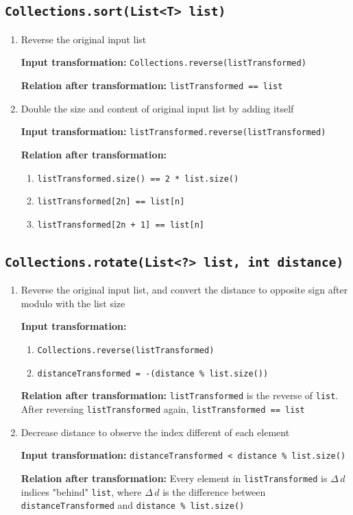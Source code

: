 \documentclass[12pt, a4paper]{article}
\begin{document}
\subsection{\texttt{Collections.sort(List<T> list)}}
\begin{enumerate}
  \item Reverse the original input list
  \par\quad\textbf{Input transformation:} \texttt{Collections.reverse(listTransformed)}
  \par\quad\textbf{Relation after transformation:} \texttt{listTransformed == list}

  \item Double the size and content of original input list by adding itself
  \par\quad\textbf{Input transformation:} \texttt{listTransformed.reverse(listTransformed)}
  \par\quad\textbf{Relation after transformation:}
  \begin{enumerate}
    \item \texttt{listTransformed.size() == 2 * list.size()}
    \item \texttt{listTransformed[2n] == list[n]}
    \item \texttt{listTransformed[2n + 1] == list[n]}
  \end{enumerate}
\end{enumerate}

\subsection{\texttt{Collections.rotate(List<?> list, int distance)}}
\begin{enumerate}
  \item Reverse the original input list, and convert the distance to opposite sign after modulo with
  the list size
  \par\quad\textbf{Input transformation:}
  \begin{enumerate}
    \item \texttt{Collections.reverse(listTransformed)}
    \item \texttt{distanceTransformed = -(distance \% list.size())}
  \end{enumerate}
  \par\quad\textbf{Relation after transformation:} \texttt{listTransformed} is the reverse of \texttt{list}.
  After reversing \texttt{listTransformed} again, \texttt{listTransformed == list}

  \item Decrease distance to observe the index different of each element
  \par\quad\textbf{Input transformation:} \texttt{distanceTransformed < distance \% list.size()}
  \par\quad\textbf{Relation after transformation:} Every element in \texttt{listTransformed} is $\Delta\,d$
  indices "behind" \texttt{list}, where $\Delta\,d$ is the difference between
  \texttt{distanceTransformed} and \texttt{distance \% list.size()}
\end{enumerate}
\end{document}
